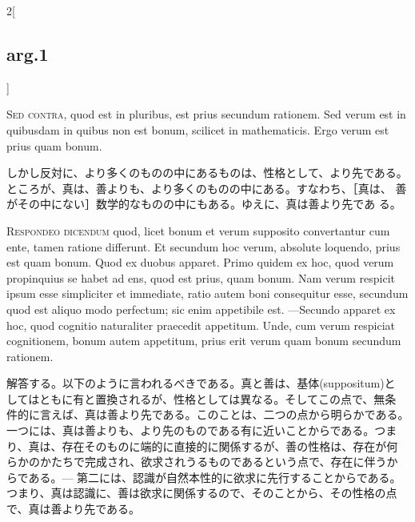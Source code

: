 \documentclass[paper=a4paper,fontsize=10pt,jafontsize=9pt,titlepage]{jlreq}
\begin{document}
\begin{paracol}{2}[\subsection{arg.1}]
\switchcolumn*[\subsection{s.c.}]


{\scshape Sed contra}, quod est in pluribus, est prius secundum
rationem. Sed verum est in quibusdam in quibus non est bonum, scilicet
in mathematicis. Ergo verum est prius quam bonum.

\switchcolumn

しかし反対に、より多くのものの中にあるものは、性格として、より先である。
 ところが、真は、善よりも、より多くのものの中にある。すなわち、［真は、
 善がその中にない］数学的なものの中にもある。ゆえに、真は善より先であ
 る。



{\scshape Respondeo dicendum} quod, licet bonum et verum supposito
convertantur cum ente, tamen ratione differunt. Et secundum hoc verum,
absolute loquendo, prius est quam bonum. Quod ex duobus apparet.
Primo quidem ex hoc, quod verum propinquius se habet ad ens, quod est
prius, quam bonum. Nam verum respicit ipsum esse simpliciter et
immediate, ratio autem boni consequitur esse, secundum quod est aliquo
modo perfectum; sic enim appetibile est.  ---Secundo apparet ex hoc,
quod cognitio naturaliter praecedit appetitum. Unde, cum verum
respiciat cognitionem, bonum autem appetitum, prius erit verum quam
bonum secundum rationem.

\switchcolumn

解答する。以下のように言われるべきである。真と善は、基体(suppositum)と
してはともに有と置換されるが、性格としては異なる。そしてこの点で、無条
件的に言えば、真は善より先である。このことは、二つの点から明らかである。
一つには、真は善よりも、より先のものである有に近いことからである。つま
り、真は、存在そのものに端的に直接的に関係するが、善の性格は、存在が何
らかのかたちで完成され、欲求されうるものであるという点で、存在に伴うか
らである。--- 第二には、認識が自然本性的に欲求に先行することからである。
つまり、真は認識に、善は欲求に関係するので、そのことから、その性格の点
で、真は善より先である。

\switchcolumn*[\subsection{ad.1}]



\end{paracol}
\end{document}
